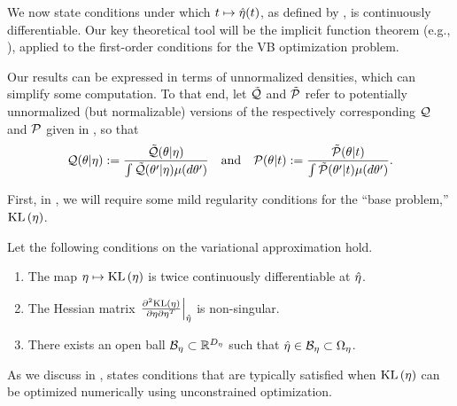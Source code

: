We now state conditions under which $t \mapsto \hat\eta(t)$, as defined by
, is continuously differentiable.  Our key theoretical tool will
be the implicit function theorem (e.g., \citet{krantz:2012:implicit}), applied
to the first-order conditions for the VB optimization problem.

Our results can be expressed in terms of unnormalized densities, which can
simplify some computation.  To that end, let $\tilde{\mathcal{Q}}$ and $\tilde{\mathcal{P}}$ refer to
potentially unnormalized (but normalizable) versions of the respectively
corresponding $\mathcal{Q}$ and $\mathcal{P}$ given in , so that
%
\begin{align*}
%
\q(\theta \vert \eta) :={}
    \frac{\qtil(\theta \vert \eta)}
    {\int \qtil(\theta' \vert \eta) \mu(d\theta')} \mathand
\p(\theta \vert \t) :={}
    \frac{\ptil(\theta \vert \t)}
    {\int \ptil(\theta' \vert \t) \mu(d\theta')}.
%
\end{align*}

First, in , we will require some mild regularity conditions
for the ``base problem,'' $\mathrm{KL}\left(\eta\right)$.

\begin{assu}
%
Let the following conditions on the variational approximation hold.
%
\begin{enumerate}
%
    \item {} The map $\eta \mapsto \mathrm{KL}\left(\eta\right)$ is twice
    continuously differentiable at $\hat\eta$.

    \item{} The Hessian matrix $\left.\frac{\partial^2 \mathrm{KL}\left(\eta\right)}{\partial \eta \partial \eta^T}\right\vert_{\hat\eta}$ is non-singular.

    \item {} There exists an open ball $\mathcal{B}_\eta
    \subset \mathbb{R}^{D_{\eta}}$ such that $\hat\eta \in \mathcal{B}_\eta \subset
    \Omega_{\eta}$.
%
\end{enumerate}
%
\end{assu}

As we discuss in ,  states
conditions that are typically satisfied when $\mathrm{KL}\left(\eta\right)$ can be optimized
numerically using unconstrained optimization.

